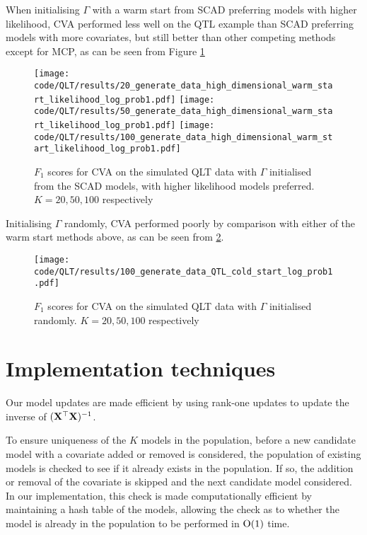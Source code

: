\documentclass{amsart}[12pt]
\begin{document}
When initialising $\Gamma$ with a warm start from SCAD preferring models with higher likelihood,
CVA performed less well on the QTL example than SCAD preferring models with more covariates, but still
better than other competing methods except for MCP,
as can be seen from Figure \ref{fig:QLT_warm_start_likelihood}
\begin{figure}\label{fig:QLT_warm_start_likelihood}
\caption{$F_1$ scores for CVA on the simulated QLT data with $\Gamma$ initialised from the SCAD models, with
higher likelihood models preferred. $K=20, 50, 100$ respectively}
\texttt{[image: code/QLT/results/20\_generate\_data\_high\_dimensional\_warm\_start\_likelihood\_log\_prob1.pdf]}
\texttt{[image: code/QLT/results/50\_generate\_data\_high\_dimensional\_warm\_start\_likelihood\_log\_prob1.pdf]}
\texttt{[image: code/QLT/results/100\_generate\_data\_high\_dimensional\_warm\_start\_likelihood\_log\_prob1.pdf]}
\end{figure}

Initialising $\Gamma$ randomly, CVA performed poorly by comparison with either of the warm start methods
above, as can be seen from \ref{fig:QLT_cold_start}.
\begin{figure}\label{fig:QLT_cold_start}
\caption{$F_1$ scores for CVA on the simulated QLT data with $\Gamma$ initialised randomly. $K=20, 50, 100$ respectively}
\texttt{[image: code/QLT/results/100\_generate\_data\_QTL\_cold\_start\_log\_prob1.pdf]}
\end{figure}

\section{Implementation techniques}
Our model updates are made efficient by using rank-one updates to update the inverse of $({\bf X}^\top {\bf X})^{-1}$.

To ensure uniqueness of the $K$ models in the population, before a new candidate model with a covariate added
or removed is considered, the population of existing models is checked to see if it already exists in the
population. If so, the addition or removal of the covariate is skipped and the next candidate model considered.
In our implementation, this check is made computationally efficient by maintaining a hash table of the models,
allowing the check as to whether the model is already in the population to be performed in $\text{O}(1)$ time.



\end{document}

